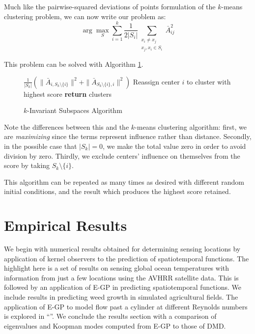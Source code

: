 \documentclass[letterpaper,12pt,peerreviewca,draftcls]{IEEEtran}
\begin{document}
Much like the pairwise-squared deviations of points formulation of the $k$-means clustering problem, we can now write our problem as:
$$\arg\max_S \sum_{i=1}^k \frac{1}{2|S_i|} \sum_{\substack{x_i \neq x_j \\ x_j,x_i\in S_i}} \bar A_{ij}^2 $$

This problem can be solved with Algorithm \ref{kinvsub}.

\begin{figure}[t!]
	\begin{algorithm}[H]
		\caption{$k$-Invariant Subspaces Algorithm}
		\label{kinvsub}
		\begin{algorithmic}
				 $ \frac{1}{|S_k|} \left( \|\bar A_{i, S_k\setminus \{i\} } \|^2 + \|\bar A_{S_k\setminus \{i\},i} \|^2 \right)$
				\STATE Reassign center $i$ to cluster with highest score
				\ENDFOR
				\ENDWHILE   
				\STATE \textbf{return} clusters
		\end{algorithmic}
	\end{algorithm}
	\vspace{-0.2in}
\end{figure}



Note the differences between this and the $k$-means clustering algorithm: first, we are \emph{maximizing} since the terms represent influence rather than distance. Secondly, in the possible case that $|S_k|=0$, we make the total value zero in order to avoid division by zero. Thirdly, we exclude centers' influence on themselves from the score by taking $S_k\setminus\{i\}$.

This algorithm can be repeated as many times as desired with different random initial conditions, and the result which produces the highest score retained.







%

\section{Empirical Results}
We begin with numerical results obtained for determining sensing locations by application of kernel observers to the prediction of spatiotemporal functions. The highlight here is a set of results on sensing global ocean temperatures with information from just a few locations using the AVHRR satellite data. This is followed by an application of E-GP in predicting spatiotemporal functions. We include results in predicting weed growth in simulated agricultural fields. The application of E-GP to model flow past a cylinder at different Reynolds numbers is explored in ``''. We conclude the results section with a comparison of eigenvalues and Koopman modes computed from E-GP to those of DMD. 
\end{document}
